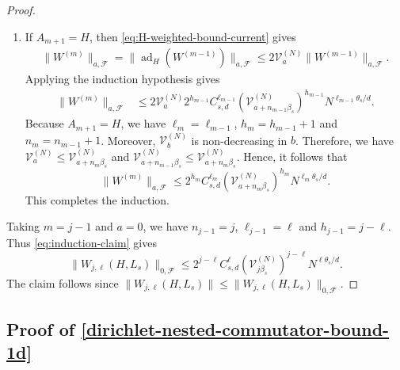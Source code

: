 \documentclass[10pt,reqno]{article}
\numberwithin{equation}{section}
\theoremstyle{plain}
\theoremstyle{definition}
\begin{document}
\begin{proof}
\begin{enumerate}
\begin{enumerate}
\item If \(A_{m+1}=H\), then \cref{eq:H-weighted-bound-current} gives
\begin{align}
\|W^{(m)}\|_{a,\mathcal F} = \|\operatorname{ad}_{H}(W^{(m-1)})\|_{a,\mathcal F} \leq 2\mathcal V_a^{(N)} \|W^{(m-1)}\|_{a,\mathcal F}.
\end{align}
Applying the induction hypothesis gives
\begin{align}
\|W^{(m)}\|_{a,\mathcal F} &\leq 2\mathcal V_a^{(N)} 2^{h_{m-1}} C_{s,d}^{\ell_{m-1}} ( \mathcal V_{a+n_{m-1}\beta_s}^{(N)} )^{h_{m-1}} N^{\ell_{m-1}\theta_s/d}.
\end{align}
Because \(A_{m+1}=H\), we have $\ell_m=\ell_{m-1}$, $h_m=h_{m-1}+1$ and $n_m=n_{m-1}+1$. Moreover, \(\mathcal V_b^{(N)}\) is non-decreasing in \(b\). Therefore, we have $\mathcal V_a^{(N)} \leq \mathcal V_{a+n_m\beta_s}^{(N)}$ and $\mathcal V_{a+n_{m-1}\beta_s}^{(N)} \leq \mathcal V_{a+n_m\beta_s}^{(N)}$. Hence, it follows that
\begin{equation}
\|W^{(m)}\|_{a,\mathcal F} \leq 2^{h_m} C_{s,d}^{\ell_m} ( \mathcal V_{a+n_m\beta_s}^{(N)} )^{h_m} N^{\ell_m\theta_s/d}.
\end{equation}
This completes the induction.
\end{enumerate}
\end{enumerate}
Taking \(m=j-1\) and \(a=0\), we have $n_{j-1}=j$, $\ell_{j-1}=\ell$ and $h_{j-1}=j-\ell$. Thus \cref{eq:induction-claim} gives
\begin{equation}
\|W_{j,\ell}(H,L_s)\|_{0,\mathcal F} \leq 2^{j-\ell} C_{s,d}^{\ell} (\mathcal V_{j\beta_s}^{(N)} )^{j-\ell} N^{\ell\theta_s/d}.
\end{equation}
The claim follows since $\|W_{j,\ell}(H,L_s)\|\leq \|W_{j,\ell}(H,L_s)\|_{0,\mathcal F}$.
\end{proof}


\subsection{Proof of \cref{dirichlet-nested-commutator-bound-1d}}\label{proof-of-dirichlet-nested-commutator-bound-1d}
\end{document}
